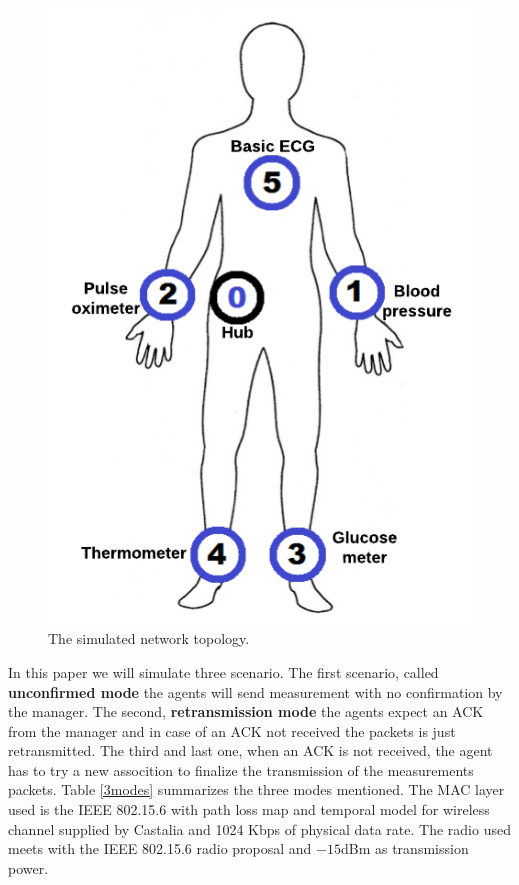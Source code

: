 \begin{figure}[htbp]
\centerline{\includegraphics[scale=0.31]{figures/corpoSensoresNomes.png}}
\caption{The simulated network topology.}
\label{fig:wbantopology}
\end{figure}

In this paper we will simulate three scenario. The first scenario, called \textbf{unconfirmed mode} the agents will send measurement with no confirmation by the manager. The second, \textbf{retransmission mode} the agents expect an ACK from the manager and in case of an ACK not received the packets is just retransmitted. The third and last one, when an ACK is not received, the agent has to try a new assocition to finalize the transmission of the measurements packets. Table \ref{3modes} summarizes the three modes mentioned. The MAC layer used is the IEEE 802.15.6 with path loss map and temporal model for wireless channel supplied by Castalia and 1024 Kbps of physical data rate. The radio used meets with the IEEE 802.15.6 radio proposal \cite{b5} and $-15$dBm as transmission power.

